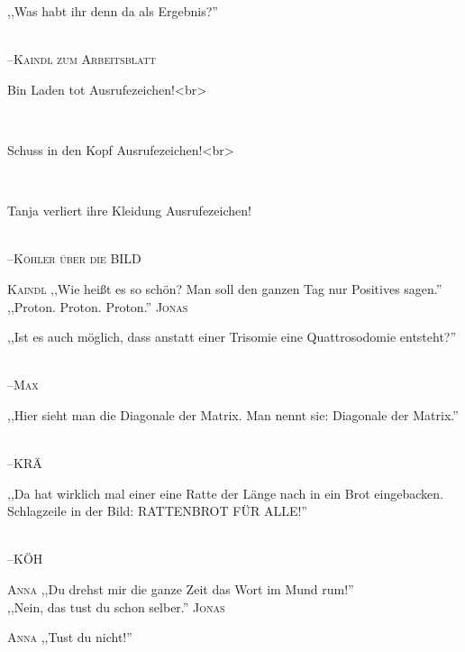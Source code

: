 \vspace{3mm}
{\raggedright ,,Was habt ihr denn da als Ergebnis?''}\\
\raggedleft \textsc{\footnotesize --\/Kaindl zum Arbeitsblatt}\\

\vspace{3mm}
{\raggedright Bin Laden tot Ausrufezeichen!<br>}\\
{\raggedright Schuss in den Kopf Ausrufezeichen!<br>}\\
{\raggedright Tanja verliert ihre Kleidung Ausrufezeichen!}\\
\raggedleft \textsc{\footnotesize --\/Köhler über die BILD}\\

\vspace{3mm}
\hangindent=0.7cm
\raggedright \textsc{\footnotesize Kaindl} ,,Wie heißt es so schön? Man soll den ganzen Tag nur Positives sagen.''\\
\raggedleft ,,Proton. Proton. Proton.'' \textsc{\footnotesize Jonas}\\

\vspace{3mm}
{\raggedright ,,Ist es auch möglich, dass anstatt einer Trisomie eine Quattrosodomie entsteht?''}\\
\raggedleft \textsc{\footnotesize --\/Max}\\

\vspace{3mm}
{\raggedright ,,Hier sieht man die Diagonale der Matrix. Man nennt sie: Diagonale der Matrix.''}\\
\raggedleft \textsc{\footnotesize --\/KRÄ}\\

\vspace{3mm}
{\raggedright ,,Da hat wirklich mal einer eine Ratte der Länge nach in ein Brot eingebacken. Schlagzeile in der Bild: RATTENBROT FÜR ALLE!''}\\
\raggedleft \textsc{\footnotesize --\/KÖH}\\

\vspace{3mm}
\hangindent=0.7cm
\raggedright \textsc{\footnotesize Anna} ,,Du drehst mir die ganze Zeit das Wort im Mund rum!''\\
\raggedleft ,,Nein, das tust du schon selber.'' \textsc{\footnotesize Jonas}\\
\hangindent=0.7cm
\raggedright \textsc{\footnotesize Anna} ,,Tust du nicht!''\\

